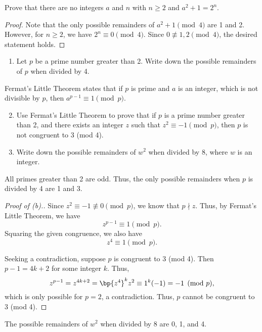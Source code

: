 \begin{problem}
    Prove that there are no integers $a$ and $n$ with $n \geq 2$ and $a^2 + 1 = 2^n$.
\end{problem}
\begin{proof}
    Note that the only possible remainders of $a^2 + 1 \pmod{4}$ are 1 and 2. However, for $n \geq 2$, we have $2^n \equiv 0 \pmod{4}$. Since $0 \not\equiv 1, 2 \pmod{4}$, the desired statement holds.
\end{proof}

\begin{problem}
    \begin{enumerate}
        \item Let $p$ be a prime number greater than 2. Write down the possible remainders of $p$ when divided by 4.
    \end{enumerate}

    Fermat's Little Theorem states that if $p$ is prime and $a$ is an integer, which is not divisible by $p$, then $a^{p-1} \equiv 1 \pmod{p}$.

    \begin{enumerate}
        \setcounter{enumi}{1}
        \item Use Fermat's Little Theorem to prove that if $p$ is a prime number greater than 2, and there exists an integer $z$ such that $z^2 \equiv -1 \pmod{p}$, then $p$ is not congruent to 3 (mod 4).
        \item Write down the possible remainders of $w^2$ when divided by 8, where $w$ is an integer.
    \end{enumerate}
\end{problem}
\begin{solution}
    \begin{ppart}
        All primes greater than 2 are odd. Thus, the only possible remainders when $p$ is divided by 4 are 1 and 3.
    \end{ppart}
    \begin{proof}[Proof of \textit{(b)}.]
        Since $z^2 \equiv -1 \not\equiv 0 \pmod{p}$, we know that $p \nmid z$. Thus, by Fermat's Little Theorem, we have \[z^{p-1} \equiv 1 \pmod{p}.\] Squaring the given congruence, we also have \[z^4 \equiv 1 \pmod{p}.\]

        Seeking a contradiction, suppose $p$ is congruent to 3 (mod 4). Then $p-1 = 4k+2$ for some integer $k$. Thus, \[z^{p-1} = z^{4k+2} = \bp{z^4}^k z^2 \equiv 1^k (-1) = -1 \pmod{p},\] which is only possible for $p = 2$, a contradiction. Thus, $p$ cannot be congruent to 3 (mod 4).
    \end{proof}
    \setcounter{partnum}{2}
    \begin{ppart}
        The possible remainders of $w^2$ when divided by 8 are 0, 1, and 4.
    \end{ppart}
\end{solution}

